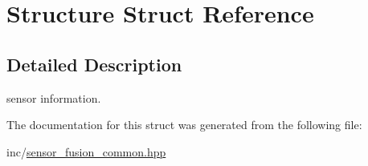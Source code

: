 \hypertarget{structStructure}{}\section{Structure Struct Reference}
\label{structStructure}


\subsection{Detailed Description}
sensor information. 

The documentation for this struct was generated from the following file\+:\begin{DoxyCompactItemize}
\item 
inc/\hyperlink{sensor__fusion__common_8hpp}{sensor\+\_\+fusion\+\_\+common.\+hpp}\end{DoxyCompactItemize}
